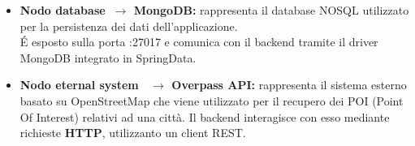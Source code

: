 \begin{itemize}
\begin{itemize}
\begin{itemize}
            \end{itemize}
            Il nodo server comunica con MongoDB tramite \textbf{Spring Data MongoDB} e con Overpass API tramite \textbf{HTTP query (REST client)}.
    \end{itemize}
    \item \textbf{Nodo \guillemotleft database\guillemotright \ $\to$ MongoDB:} rappresenta il database NOSQL utilizzato per la persistenza dei dati dell'applicazione.\\
    É esposto sulla porta :27017 e comunica con il backend tramite il driver MongoDB integrato in SpringData.
    \item \textbf{Nodo \guillemotleft eternal system \guillemotright \ $\to$ Overpass API:} rappresenta il sistema esterno basato su OpenStreetMap che viene utilizzato per il recupero dei POI (Point Of Interest) relativi ad una città.
    Il backend interagisce con esso mediante richieste \textbf{HTTP}, utilizzanto un client REST.

\end{itemize}

